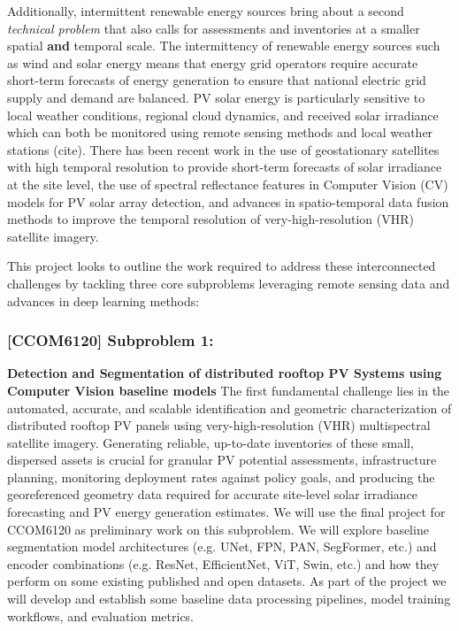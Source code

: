 Additionally, intermittent renewable energy sources bring about a second \textit{technical problem} that also calls for assessments and inventories at a smaller spatial \textbf{and} temporal scale. The intermittency of renewable energy sources such as wind and solar energy means that energy grid operators require accurate short-term forecasts of energy generation to ensure that national electric grid 
supply and demand are balanced. PV solar energy is particularly sensitive to local weather conditions, regional cloud dynamics, and received solar irradiance which can both be monitored using 
remote sensing methods and local weather stations (cite). There has been recent work in the use of geostationary satellites with high temporal resolution to provide short-term forecasts of solar irradiance at the site level\cite{Bansal_ssl_nowcasting_2022}, 
the use of spectral reflectance features in Computer Vision (CV) models for PV solar array detection\cite{He_universal_pv_spectral_index_2024}, and advances in spatio-temporal data fusion methods to improve the temporal resolution of very-high-resolution (VHR) satellite imagery\cite{Tremenbert_Kasmi_pyPV_roof_2023}. 

This project looks to outline the work required to address these interconnected challenges by tackling three core subproblems leveraging remote sensing data and advances in deep learning methods:

\subsubsection{[CCOM6120] Subproblem 1:}
    \textbf{Detection and Segmentation of distributed rooftop PV Systems using Computer Vision baseline models} 
    The first fundamental challenge lies in the automated, accurate, and scalable identification and geometric characterization of distributed rooftop PV panels using very-high-resolution (VHR) multispectral satellite imagery. 
    Generating reliable, up-to-date inventories of these small, dispersed assets is crucial for granular PV potential assessments\cite{Pueblas_workflow_rooftop_PV_assessment_sat_img_2023}\cite{Jiang_rooftop_pv_assessment_2022}, infrastructure planning, 
    monitoring deployment rates against policy goals\cite{de-Hoog_sota_survey_2020}, and producing the georeferenced geometry data required for accurate site-level solar irradiance forecasting and PV energy generation estimates\cite{Bansal_ssl_nowcasting_2022}.
    We will use the final project for CCOM6120 as preliminary work on this subproblem. We will explore baseline segmentation model architectures (e.g. UNet, FPN, PAN, SegFormer, etc.) and 
    encoder combinations (e.g. ResNet, EfficientNet, ViT, Swin, etc.) and how they perform on some existing published and open datasets. As part of the project we will develop and establish some baseline data processing pipelines, model training workflows, and evaluation metrics.

